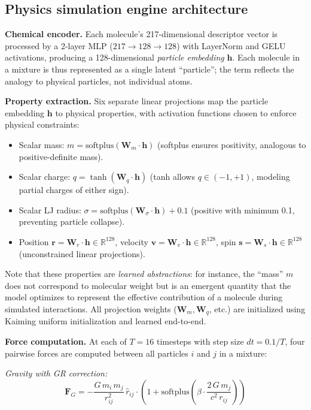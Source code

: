 \documentclass[11pt,a4paper]{article}
\begin{document}
\subsection{Physics simulation engine architecture}

\textbf{Chemical encoder.} Each molecule's 217-dimensional descriptor vector is processed by a 2-layer MLP ($217 \to 128 \to 128$) with LayerNorm and GELU activations, producing a 128-dimensional \emph{particle embedding} $\mathbf{h}$. Each molecule in a mixture is thus represented as a single latent ``particle''; the term reflects the analogy to physical particles, not individual atoms.

\textbf{Property extraction.} Six separate linear projections map the particle embedding $\mathbf{h}$ to physical properties, with activation functions chosen to enforce physical constraints:
\begin{itemize}
    \item Scalar mass: $m = \text{softplus}(\mathbf{W}_m \cdot \mathbf{h})$ (softplus ensures positivity, analogous to positive-definite mass).
    \item Scalar charge: $q = \tanh(\mathbf{W}_q \cdot \mathbf{h})$ (tanh allows $q \in (-1, +1)$, modeling partial charges of either sign).
    \item Scalar LJ radius: $\sigma = \text{softplus}(\mathbf{W}_\sigma \cdot \mathbf{h}) + 0.1$ (positive with minimum 0.1, preventing particle collapse).
    \item Position $\mathbf{r} = \mathbf{W}_r \cdot \mathbf{h} \in \mathbb{R}^{128}$, velocity $\mathbf{v} = \mathbf{W}_v \cdot \mathbf{h} \in \mathbb{R}^{128}$, spin $\mathbf{s} = \mathbf{W}_s \cdot \mathbf{h} \in \mathbb{R}^{128}$ (unconstrained linear projections).
\end{itemize}
Note that these properties are \emph{learned abstractions}: for instance, the ``mass'' $m$ does not correspond to molecular weight but is an emergent quantity that the model optimizes to represent the effective contribution of a molecule during simulated interactions. All projection weights ($\mathbf{W}_m, \mathbf{W}_q$, etc.) are initialized using Kaiming uniform initialization and learned end-to-end.

\textbf{Force computation.} At each of $T = 16$ timesteps with step size $dt = 0.1/T$, four pairwise forces are computed between all particles $i$ and $j$ in a mixture:

\emph{Gravity with GR correction:}
\begin{equation}
\mathbf{F}_{G} = -\frac{G \, m_i \, m_j}{r_{ij}^2} \, \hat{r}_{ij} \cdot \left(1 + \text{softplus}\!\left(\beta \cdot \frac{2\,G\,m_j}{c^2 \, r_{ij}}\right)\right)
\end{equation}
\end{document}

